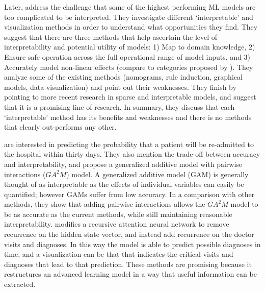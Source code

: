     Later, \citet{Van_Belle2013-ph} address the challenge that some of the highest performing ML models are too complicated to be interpreted. They investigate different `interpretable' and visualization methods in order to understand what opportunities they find. They suggest that there are three methods that help ascertain the level of interpretability and potential utility of models: 1) Map to domain knowledge, 2) Ensure safe operation across the full operational range of model inputs, and 3) Accurately model non-linear effects (compare to categories proposed by \citet{Lipton2016-ug}). They analyze some of the existing methods (nomograms, rule induction, graphical models, data visualization) and point out their weaknesses. They finish by pointing to more recent research in sparse and interpretable models, and suggest that it is a promising line of research. In summary, they discuss that each `interpretable' method has its benefits and weaknesses and there is no methods that clearly out-performs any other.

    \citet{Caruana2015-za} are interested in predicting the probability that a patient will be re-admitted to the hospital within thirty days. They also mention the trade-off between accuracy and interpretability, and propose a generalized additive model with pairwise interactions ($GA^2M$) model. A generalized additive model (GAM) is generally thought of as interpretable as the effects of individual variables can easily be quantified; however GAMs suffer from low accuracy. In a comparison with other methods, they show that adding pairwise interactions allows the $GA^2M$ model to be as accurate as the current methods, while still maintaining reasonable interpretability.  
 \citet{Choi2016-by} modifies a recursive attention neural network to remove recurrence on the hidden state vector, and instead add recurrence on the doctor visits and diagnoses. In this way the model is able to predict possible diagnoses in time, and a visualization can be that that indicates the critical visits and diagnoses that lead to that prediction. These methods are promising because it restructures an advanced learning model in a way that useful information can be extracted. 

